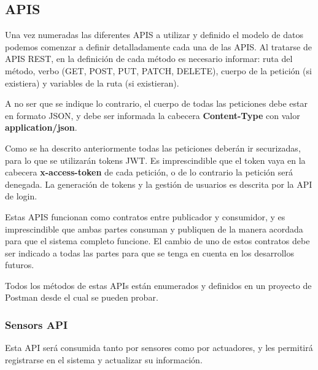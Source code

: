 \subsection{APIS}
Una vez numeradas las diferentes APIS a utilizar y definido el modelo de datos podemos comenzar a definir detalladamente cada una de las APIS.
Al tratarse de APIS REST, en la definición
de cada método es necesario informar: ruta del método, verbo (GET, POST, PUT, PATCH, DELETE), cuerpo de la petición (si existiera) y variables
de la ruta (si existieran).
\par
A no ser que se indique lo contrario, el cuerpo de todas las peticiones debe estar en formato JSON, y debe ser
informada la cabecera \textbf{Content-Type} con valor \textbf{application/json}.
\par
Como se ha descrito anteriormente todas las peticiones deberán ir securizadas, para lo que se utilizarán tokens JWT. Es imprescindible que el
token vaya en la cabecera \textbf{x-access-token} de cada petición, o de lo contrario la petición será denegada. La generación de tokens y la gestión
de usuarios es descrita por la API de login.
\par
Estas APIS funcionan como contratos entre publicador y consumidor, y es imprescindible que ambas partes consuman y publiquen de la 
manera acordada para que el sistema completo funcione. El cambio de uno de estos contratos debe ser indicado a todas las partes para que se tenga
en cuenta en los desarrollos futuros.
\par
Todos los métodos de estas APIs están enumerados y definidos en un proyecto de Postman desde el cual se pueden probar.
\par
\subsubsection{Sensors API}
Esta API será consumida tanto por sensores como por actuadores, y les permitirá registrarse en el sistema y actualizar su información.

